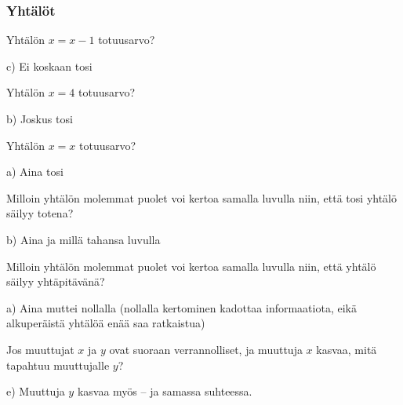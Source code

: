 \subsubsection*{Yhtälöt}
\begin{multicols}{2}

\begin{tehtava}
Yhtälön $x = x-1$ totuusarvo?
\begin{vastaus}
c) Ei koskaan tosi
\end{vastaus}
\end{tehtava}

\begin{tehtava}
Yhtälön $x = 4$ totuusarvo?
\begin{vastaus}
b) Joskus tosi
\end{vastaus}
\end{tehtava}

\begin{tehtava}
Yhtälön $x = x$ totuusarvo?
\begin{vastaus}
a) Aina tosi
\end{vastaus}
\end{tehtava}

\begin{tehtava}
Milloin yhtälön molemmat puolet voi kertoa samalla luvulla niin, että tosi yhtälö säilyy totena?
	\begin{vastaus}
b) Aina ja millä tahansa luvulla
	\end{vastaus}
\end{tehtava}

\begin{tehtava}
Milloin yhtälön molemmat puolet voi kertoa samalla luvulla niin, että yhtälö säilyy yhtäpitävänä?
\begin{vastaus}
a) Aina muttei nollalla (nollalla kertominen kadottaa informaatiota, eikä alkuperäistä yhtälöä enää saa ratkaistua)
\end{vastaus}
\end{tehtava}

\begin{tehtava}
Jos muuttujat $x$ ja $y$ ovat suoraan verrannolliset, ja muuttuja $x$ kasvaa, mitä tapahtuu muuttujalle $y$?
\begin{vastaus}
e) Muuttuja $y$ kasvaa myös -- ja samassa suhteessa.
\end{vastaus}
\end{tehtava}


\end{multicols}
